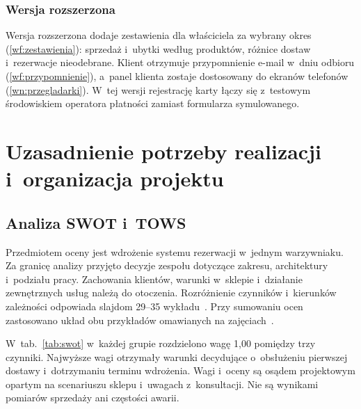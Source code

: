 \documentclass[12pt,a4paper,oneside]{article}
\newcounter{pu}
\begin{document}
\subsubsection{Wersja rozszerzona}

Wersja rozszerzona dodaje zestawienia dla właściciela za wybrany okres (\ref{wf:zestawienia}): sprzedaż i~ubytki według produktów, różnice dostaw i~rezerwacje nieodebrane. Klient otrzymuje przypomnienie e-mail w~dniu odbioru (\ref{wf:przypomnienie}), a~panel klienta zostaje dostosowany do ekranów telefonów (\ref{wn:przegladarki}). W~tej wersji rejestrację karty łączy się z~testowym środowiskiem operatora płatności zamiast formularza symulowanego.


\clearpage
\section{Uzasadnienie potrzeby realizacji i~organizacja projektu}
\label{ch:uzasadnienie}

\subsection{Analiza SWOT i~TOWS}
\label{sec:swot}

Przedmiotem oceny jest wdrożenie systemu rezerwacji w~jednym warzywniaku. Za granicę analizy przyjęto decyzje zespołu dotyczące zakresu, architektury i~podziału pracy. Zachowania klientów, warunki w~sklepie i~działanie zewnętrznych usług należą do otoczenia. Rozróżnienie czynników i~kierunków zależności odpowiada slajdom 29--35 wykładu~\cite{wyklad}. Przy sumowaniu ocen zastosowano układ obu przykładów omawianych na zajęciach~\cite{przyklady-swot}.

W~tab.~\ref{tab:swot} w~każdej grupie rozdzielono wagę 1,00 pomiędzy trzy czynniki. Najwyższe wagi otrzymały warunki decydujące o~obsłużeniu pierwszej dostawy i~dotrzymaniu terminu wdrożenia. Wagi i~oceny są osądem projektowym opartym na scenariuszu sklepu i~uwagach z~konsultacji. Nie są wynikami pomiarów sprzedaży ani częstości awarii.
\end{document}
